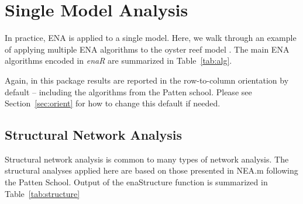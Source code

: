 \documentclass[11pt]{article}
\begin{document}

\section{Single Model Analysis}
In practice, ENA is applied to a single model.  Here, we walk through an
example of applying multiple ENA algorithms to the oyster reef model
\citep{dame81}.  The main ENA algorithms encoded in \textit{enaR} are
summarized in Table~\ref{tab:alg}. 

Again, in this package results are reported in the row-to-column
orientation by default -- including the algorithms from the Patten
school.  Please see Section~\ref{sec:orient} for how to change this
default if needed.  

\subsection{Structural Network Analysis}
Structural network analysis is common to many types of network
analysis.  The structural analyses applied here are based on those
presented in NEA.m \citep{fath06} following the Patten School.  Output
of the enaStructure function is summarized in Table~\ref{tab:structure}  
\end{document}
